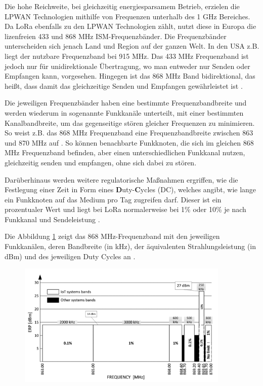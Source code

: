 Die hohe Reichweite, bei gleichzeitig energiesparsamem Betrieb, erzielen die LPWAN Technologien mithilfe von Frequenzen unterhalb des 1 GHz Bereiches. Da LoRa ebenfalls zu den LPWAN Technologien zählt, nutzt diese in Europa die lizenfreien 433 und 868 MHz ISM-Frequenzbänder. Die Frequenzbänder unterscheiden sich jenach Land und Region auf der ganzen Welt. In den USA z.B. liegt der nutzbare Frequenzband bei 915 MHz. Das 433 MHz Frequenzband ist jedoch nur für unidirektionale Übertragung, wo man entweder nur Senden oder Empfangen kann, vorgesehen. Hingegen ist das 868 MHz Band bidirektional, das heißt, dass damit das gleichzeitige Senden und Empfangen gewährleistet ist \cite{lpwan2022}. 

Die jeweiligen Frequenzbänder haben eine bestimmte Frequenzbandbreite und werden wiederum in sogenannte Funkkanäle unterteilt, mit einer bestimmten Kanalbandbreite, um das gegenseitige stören gleicher Frequenzen zu minimieren. So weist z.B. das 868 MHz Frequenzband eine Frequenzbandbreite zwischen 863 und 870 MHz auf \cite{Staniec2020}. So können benachbarte Funkknoten, die sich im gleichen 868 MHz Frequenzband befinden, aber einen unterschiedlichen Funkkanal nutzen, gleichzeitig senden und empfangen, ohne sich dabei zu stören. 

Darüberhinaus werden weitere regulatorische Maßnahmen ergriffen, wie die Festlegung einer Zeit in Form eines \textbf{D}uty-\textbf{C}ycles (DC), welches angibt, wie lange ein Funkknoten auf das Medium pro Tag zugreifen darf. Dieser ist ein prozentualer Wert und liegt bei LoRa normalerweise bei 1\% oder 10\% je nach Funkkanal und Sendeleistung \cite{Staniec2020}. 

Die Abbildung \ref{fig:868-band} zeigt das 868 MHz-Frequenzband mit den jeweiligen Funkkanälen, deren Bandbreite (in kHz), der äquivalenten Strahlungsleistung (in dBm) und des jeweiligen Duty Cycles an . 

\begin{figure}[h]
 \centering
 \includegraphics[width=0.9\textwidth]{pictures/868-band}
 \caption[Aufteilung des 868-ISM-Bandes in Funkkanäle nach ETSI EN 300 220-2]{ \cite{Staniec2020}}
 \label{fig:868-band}
\end{figure}

